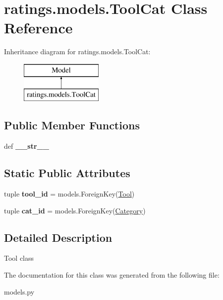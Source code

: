 \hypertarget{classratings_1_1models_1_1ToolCat}{\section{ratings.\-models.\-Tool\-Cat Class Reference}
\label{classratings_1_1models_1_1ToolCat}
}
Inheritance diagram for ratings.\-models.\-Tool\-Cat\-:\begin{figure}[H]
\begin{center}
\leavevmode
\includegraphics[height=2.000000cm]{classratings_1_1models_1_1ToolCat}
\end{center}
\end{figure}
\subsection*{Public Member Functions}
\begin{DoxyCompactItemize}
\item 
\hypertarget{classratings_1_1models_1_1ToolCat_a3d744035e57606834981035843b9b20e}{def {\bfseries \-\_\-\-\_\-str\-\_\-\-\_\-}}\label{classratings_1_1models_1_1ToolCat_a3d744035e57606834981035843b9b20e}

\end{DoxyCompactItemize}
\subsection*{Static Public Attributes}
\begin{DoxyCompactItemize}
\item 
\hypertarget{classratings_1_1models_1_1ToolCat_ac04b966b5d4a292235c11cff3760ac93}{tuple {\bfseries tool\-\_\-id} = models.\-Foreign\-Key(\hyperlink{classratings_1_1models_1_1Tool}{Tool})}\label{classratings_1_1models_1_1ToolCat_ac04b966b5d4a292235c11cff3760ac93}

\item 
\hypertarget{classratings_1_1models_1_1ToolCat_a6c1906b30c047a2b6fe2a37292dd3242}{tuple {\bfseries cat\-\_\-id} = models.\-Foreign\-Key(\hyperlink{classratings_1_1models_1_1Category}{Category})}\label{classratings_1_1models_1_1ToolCat_a6c1906b30c047a2b6fe2a37292dd3242}

\end{DoxyCompactItemize}


\subsection{Detailed Description}
\begin{DoxyVerb}Tool class
\end{DoxyVerb}
 

The documentation for this class was generated from the following file\-:\begin{DoxyCompactItemize}
\item 
models.\-py\end{DoxyCompactItemize}
